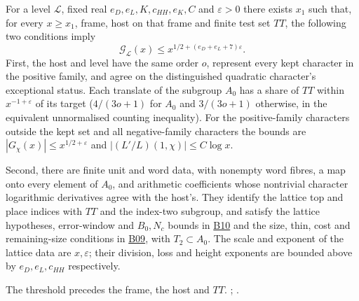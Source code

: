 
\begin{proposition}\label{sub:B08}
For a level $\mathcal L$, fixed real $e_D,e_L,K,c_{HH},e_K,C$ and
$\varepsilon>0$ there exists $x_1$ such that, for every $x\ge x_1$,
frame, host on that frame and finite test set $TT$, the following two
conditions imply
\[
       \mathcal G_{\mathcal L}(x)\le x^{1/2+(e_D+e_L+7)\varepsilon}.
\]
First, the host and level have the same order $o$, represent every kept
character in the positive family, and agree on the distinguished
quadratic character's exceptional status. Each translate of the subgroup
$A_0$ has a share of $TT$ within $x^{-1+\varepsilon}$ of its target
($4/(3o+1)$ for $A_0$ and $3/(3o+1)$ otherwise, in the equivalent
unnormalised counting inequality). For the positive-family characters
outside the kept set and all negative-family characters the bounds are
$|G_\chi(x)|\le x^{1/2+\varepsilon}$ and $|(L'/L)(1,\chi)|\le C\log x$.

Second, there are finite unit and word data, with nonempty word fibres,
a map onto every element of $A_0$, and arithmetic coefficients whose
nontrivial character logarithmic derivatives agree with the host's.
They identify the lattice top and place indices with $TT$ and the
index-two subgroup, and satisfy the lattice hypotheses, error-window
and $B_0,N_c$ bounds in \hyperref[sub:B10]{B10} and the size, thin,
cost and remaining-size conditions in \hyperref[sub:B09]{B09}, with
$T_2\subset A_0$. The scale and exponent of the lattice data are
$x,\varepsilon$; their division, loss and height exponents are bounded
above by $e_D,e_L,c_{HH}$ respectively.
\end{proposition}
The threshold precedes the frame, the host and $TT$.
;
.
